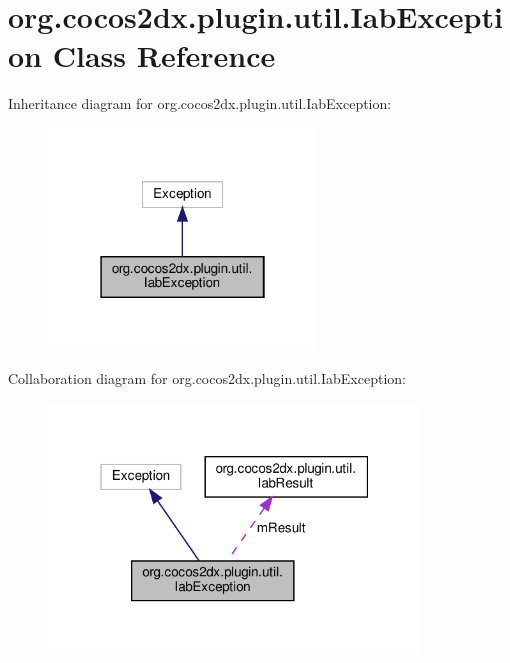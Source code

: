 \hypertarget{classorg_1_1cocos2dx_1_1plugin_1_1util_1_1IabException}{}\section{org.\+cocos2dx.\+plugin.\+util.\+Iab\+Exception Class Reference}
\label{classorg_1_1cocos2dx_1_1plugin_1_1util_1_1IabException}


Inheritance diagram for org.\+cocos2dx.\+plugin.\+util.\+Iab\+Exception\+:
\nopagebreak
\begin{figure}[H]
\begin{center}
\leavevmode
\includegraphics[width=202pt]{classorg_1_1cocos2dx_1_1plugin_1_1util_1_1IabException__inherit__graph}
\end{center}
\end{figure}


Collaboration diagram for org.\+cocos2dx.\+plugin.\+util.\+Iab\+Exception\+:
\nopagebreak
\begin{figure}[H]
\begin{center}
\leavevmode
\includegraphics[width=280pt]{classorg_1_1cocos2dx_1_1plugin_1_1util_1_1IabException__coll__graph}
\end{center}
\end{figure}
